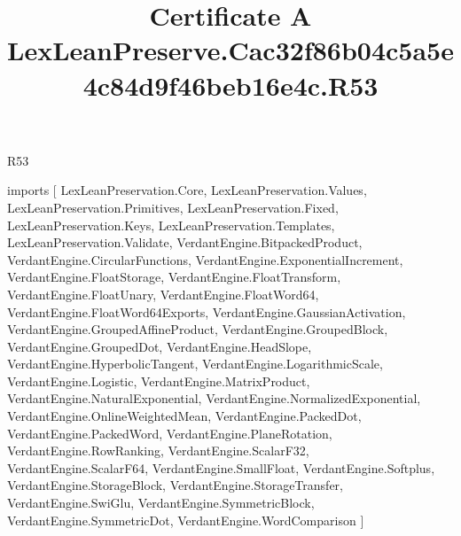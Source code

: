 \begin{lexlean}{R53}
\title{Certificate A LexLeanPreserve.Cac32f86b04c5a5e4c84d9f46beb16e4c.R53}
\begin{coremodule}
imports [
  LexLeanPreservation.Core,
  LexLeanPreservation.Values,
  LexLeanPreservation.Primitives,
  LexLeanPreservation.Fixed,
  LexLeanPreservation.Keys,
  LexLeanPreservation.Templates,
  LexLeanPreservation.Validate,
  VerdantEngine.BitpackedProduct,
  VerdantEngine.CircularFunctions,
  VerdantEngine.ExponentialIncrement,
  VerdantEngine.FloatStorage,
  VerdantEngine.FloatTransform,
  VerdantEngine.FloatUnary,
  VerdantEngine.FloatWord64,
  VerdantEngine.FloatWord64Exports,
  VerdantEngine.GaussianActivation,
  VerdantEngine.GroupedAffineProduct,
  VerdantEngine.GroupedBlock,
  VerdantEngine.GroupedDot,
  VerdantEngine.HeadSlope,
  VerdantEngine.HyperbolicTangent,
  VerdantEngine.LogarithmicScale,
  VerdantEngine.Logistic,
  VerdantEngine.MatrixProduct,
  VerdantEngine.NaturalExponential,
  VerdantEngine.NormalizedExponential,
  VerdantEngine.OnlineWeightedMean,
  VerdantEngine.PackedDot,
  VerdantEngine.PackedWord,
  VerdantEngine.PlaneRotation,
  VerdantEngine.RowRanking,
  VerdantEngine.ScalarF32,
  VerdantEngine.ScalarF64,
  VerdantEngine.SmallFloat,
  VerdantEngine.Softplus,
  VerdantEngine.StorageBlock,
  VerdantEngine.StorageTransfer,
  VerdantEngine.SwiGlu,
  VerdantEngine.SymmetricBlock,
  VerdantEngine.SymmetricDot,
  VerdantEngine.WordComparison
]


\end{coremodule}
\end{lexlean}

